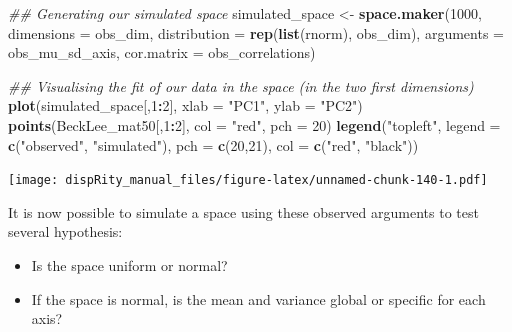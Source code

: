 \documentclass[
]{book}
\newenvironment{Shaded}{\begin{snugshade}}{\end{snugshade}}
\newcommand{\CommentTok}[1]{\textcolor[rgb]{0.56,0.35,0.01}{\textit{#1}}}
\newcommand{\DataTypeTok}[1]{\textcolor[rgb]{0.13,0.29,0.53}{#1}}
\newcommand{\DecValTok}[1]{\textcolor[rgb]{0.00,0.00,0.81}{#1}}
\newcommand{\KeywordTok}[1]{\textcolor[rgb]{0.13,0.29,0.53}{\textbf{#1}}}
\newcommand{\NormalTok}[1]{#1}
\newcommand{\OperatorTok}[1]{\textcolor[rgb]{0.81,0.36,0.00}{\textbf{#1}}}
\newcommand{\StringTok}[1]{\textcolor[rgb]{0.31,0.60,0.02}{#1}}
\providecommand{\tightlist}{%
  \setlength{\itemsep}{0pt}\setlength{\parskip}{0pt}}
\begin{document}
\begin{Shaded}
\begin{Highlighting}[]
\CommentTok{\#\# Generating our simulated space}
\NormalTok{simulated\_space \textless{}{-}}\StringTok{ }\KeywordTok{space.maker}\NormalTok{(}\DecValTok{1000}\NormalTok{, }\DataTypeTok{dimensions =}\NormalTok{ obs\_dim, }
                               \DataTypeTok{distribution =} \KeywordTok{rep}\NormalTok{(}\KeywordTok{list}\NormalTok{(rnorm), obs\_dim),}
                               \DataTypeTok{arguments =}\NormalTok{ obs\_mu\_sd\_axis,}
                               \DataTypeTok{cor.matrix =}\NormalTok{ obs\_correlations)}

\CommentTok{\#\# Visualising the fit of our data in the space (in the two first dimensions)}
\KeywordTok{plot}\NormalTok{(simulated\_space[,}\DecValTok{1}\OperatorTok{:}\DecValTok{2}\NormalTok{], }\DataTypeTok{xlab =} \StringTok{"PC1"}\NormalTok{, }\DataTypeTok{ylab =} \StringTok{"PC2"}\NormalTok{)}
\KeywordTok{points}\NormalTok{(BeckLee\_mat50[,}\DecValTok{1}\OperatorTok{:}\DecValTok{2}\NormalTok{], }\DataTypeTok{col =} \StringTok{"red"}\NormalTok{, }\DataTypeTok{pch =} \DecValTok{20}\NormalTok{)}
\KeywordTok{legend}\NormalTok{(}\StringTok{"topleft"}\NormalTok{, }\DataTypeTok{legend =} \KeywordTok{c}\NormalTok{(}\StringTok{"observed"}\NormalTok{, }\StringTok{"simulated"}\NormalTok{),}
        \DataTypeTok{pch =} \KeywordTok{c}\NormalTok{(}\DecValTok{20}\NormalTok{,}\DecValTok{21}\NormalTok{), }\DataTypeTok{col =} \KeywordTok{c}\NormalTok{(}\StringTok{"red"}\NormalTok{, }\StringTok{"black"}\NormalTok{))}
\end{Highlighting}
\end{Shaded}

\texttt{[image: dispRity\_manual\_files/figure-latex/unnamed-chunk-140-1.pdf]}

It is now possible to simulate a space using these observed arguments to test several hypothesis:

\begin{itemize}
\tightlist
\item
  Is the space uniform or normal?
\item
  If the space is normal, is the mean and variance global or specific for each axis?
\end{itemize}
\end{document}
